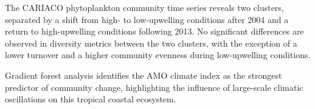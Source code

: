 \documentclass[draft]{agujournal2019}
\begin{document}






\begin{keypoints}
\item The CARIACO phytoplankton community time series reveals two clusters, separated by a shift from high- to low-upwelling conditions after 2004 and a return to high-upwelling conditions following 2013.
\index No significant differences are observed in diversity metrics between the two clusters, with the exception of a lower turnover and a higher community evenness during low-upwelling conditions.
\item Gradient forest analysis identifies the AMO climate index as the strongest predictor of community change, highlighting the influence of large-scale climatic oscillations on this tropical coastal ecosystem.
\end{keypoints}

%
%

%
%
\end{document}
